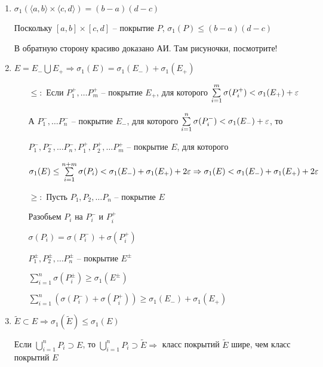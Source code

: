 \documentclass[12pt]{article}
\newcommand{\q}[1]{\langle #1 \rangle}
\begin{document}
\begin{enumerate}
    \item $\sigma_1(\q{a, b} \times \q{c, d}) = (b - a)(d - c)$
    
    Поскольку $[a, b] \times [c, d]$ -- покрытие $P$, $\sigma_1(P) \leq (b - a)(d - c)$

    В обратную сторону красиво доказано АИ. Там рисуночки, посмотрите!

    \item $E = E_- \bigcup E_+ \Rightarrow \sigma_1(E) = \sigma_1(E_-) + \sigma_1(E_+)$
    
    \begin{itemize}
        \item[$\leq :$] Если $P_1^+, \ldots P_m^+$ -- покрытие $E_+$, для которого $\sum\limits_{i = 1}^m \sigma(P_i^+) < \sigma_1(E_+) + \varepsilon$
        
        А $P_1^-, \ldots P_n^-$ -- покрытие $E_-$, для которого $\sum\limits_{i = 1}^n \sigma(P_i^-) < \sigma_1(E_-) + \varepsilon$, то

        $P_1^-, P_2^-, \ldots P_n^-, P_1^+, P_2^+, \ldots P_m^+$ -- покрытие $E$, для которого 
        
        $\sigma_1(E) \leq \sum\limits_{i = 1}^{n + m} \sigma(P_i) < \sigma_1(E_-) + \sigma_1(E_+) + 2\varepsilon \Rightarrow \sigma_1(E) < \sigma_1(E_-) + \sigma_1(E_+) + 2\varepsilon$

        \item[$\geq :$] Пусть $P_1, P_2, \ldots P_n$ -- покрытие $E$
        
        Разобьем $P_i$ на $P_i^-$ и $P_i^+$

        $\sigma(P_i) = \sigma(P_i^-) + \sigma(P_i^+)$

        $P_1^\pm, P_2^\pm, \ldots P_n^\pm$ -- покрытие $E^\pm$

        $\sum\limits_{i = 1}^n \sigma(P_i^\pm) \geq \sigma_1(E^\pm)$

        $\sum\limits_{i = 1}^n (\sigma(P_i^-) + \sigma(P_i^+)) \geq \sigma_1(E_-) + \sigma_1(E_+)$
    \end{itemize}

    \item $\tilde{E} \subset E \Rightarrow \sigma_1(\tilde{E}) \leq \sigma_1(E)$
    
    Если $\bigcup\limits_{i = 1}^n P_i \supset E$, то $\bigcup\limits_{i = 1}^n P_i \supset \tilde{E} \Rightarrow$ класс покрытий $\tilde{E}$ шире, чем класс покрытий $E$
\end{enumerate}
\end{document}
